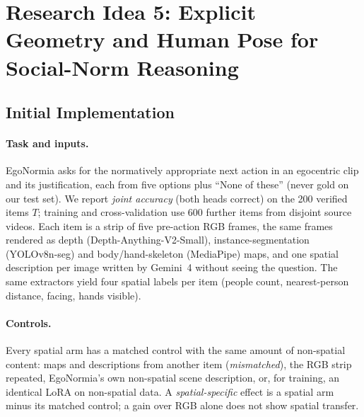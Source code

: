 \section{Research Idea 5: Explicit Geometry and Human Pose for Social-Norm Reasoning}
\subsection{Initial Implementation}
\label{sec:idea5-impl}

\paragraph{Task and inputs.}
EgoNormia asks for the normatively appropriate next action in an egocentric clip and its justification, each from five options plus ``None of these'' (never gold on our test set). We report \emph{joint accuracy} (both heads correct) on the 200 verified items $T$; training and cross-validation use 600 further items from disjoint source videos. Each item is a strip of five pre-action RGB frames, the same frames rendered as depth (Depth-Anything-V2-Small), instance-segmentation (YOLOv8n-seg) and body/hand-skeleton (MediaPipe) maps, and one spatial description per image written by Gemini~4 without seeing the question. The same extractors yield four spatial labels per item (people count, nearest-person distance, facing, hands visible).

\paragraph{Controls.}
Every spatial arm has a matched control with the same amount of non-spatial content: maps and descriptions from another item (\emph{mismatched}), the RGB strip repeated, EgoNormia's own non-spatial scene description, or, for training, an identical LoRA on non-spatial data. A \emph{spatial-specific} effect is a spatial arm minus its matched control; a gain over RGB alone does not show spatial transfer.

